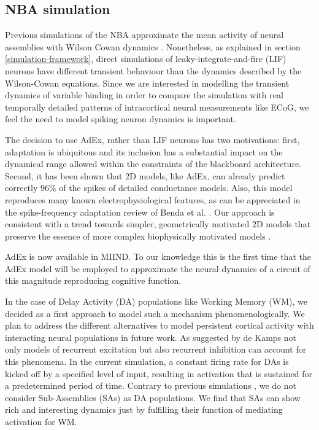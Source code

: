 \documentclass[10pt]{article}
\begin{document}
\subsection{NBA simulation}\label{architectural-decisions}

Previous simulations of the NBA approximate the mean activity of neural assemblies with Wilson Cowan dynamics \cite{Frank_2014}.
Nonetheless, as explained in section \ref{simulation-framework}, direct simulations of leaky-integrate-and-fire (LIF) neurons \cite{omurtag2000simulation} have different transient behaviour than the dynamics described by the Wilson-Cowan equations.
Since we are interested in modelling the transient dynamics of variable binding in order to compare 
the simulation with real temporally detailed patterns of intracortical neural measurements like ECoG, we feel the need to model spiking neuron dynamics is important.

The decision to use AdEx, rather than LIF neurons has two motivations: first, adaptation is ubiquitous and its inclusion has a substantial impact on the dynamical range
allowed within the constraints of the blackboard architecture. Second,  it has been shown that 2D models, like AdEx, can already predict correctly 96\% of the spikes of 
detailed conductance models\cite{brette2005adaptive}.  Also, this model reproduces many known electrophysiological features, as can be appreciated in the spike-frequency adaptation review of Benda et al. \cite{Benda_2003,Benda_2014}. Our approach is consistent with a trend towards simpler, geometrically motivated  2D   models  that preserve the essence of more complex biophysically motivated models \cite{izhikevich2007dynamical}.

AdEx is now available in  MIIND. To our knowledge this is the first time that the AdEx model will be employed to approximate the neural dynamics of a circuit of this magnitude reproducing cognitive function.

In the case of Delay Activity (DA) populations like Working Memory (WM), we decided as a first approach to model such a mechanism phenomenologically.
We plan to address the different alternatives to model persistent cortical activity with interacting neural populations in future work.
As suggested by de Kamps\cite{de_Kamps_2005} not only models of recurrent excitation but also recurrent inhibition can account for this phenomena.
In the current simulation, a constant firing rate for DAs is kicked off by a specified level of input, resulting in activation  that is sustained for a predetermined period of time.
Contrary to previous simulations \cite{velde2015ambiguity}, we do not consider Sub-Assemblies (SAs) as DA populations.
We find that SAs can show rich and interesting dynamics just by fulfilling their function of mediating activation for WM.
\end{document}

